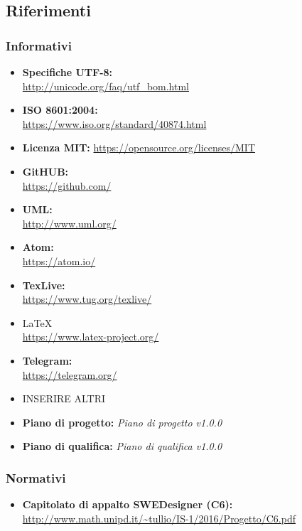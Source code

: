   \subsection{Riferimenti}
    \subsubsection{Informativi}
      \begin{itemize}
        \item \textbf{Specifiche UTF-8:}\\
        \url{http://unicode.org/faq/utf_bom.html}
        \item \textbf{ISO 8601:2004:} \\
        \url{https://www.iso.org/standard/40874.html}\\
        \item \textbf{Licenza MIT:}
        \url{https://opensource.org/licenses/MIT}\\
        \item \textbf{GitHUB:}\\
        \url{https://github.com/}
        \item \textbf{UML:} \\
        \url{http://www.uml.org/}
        \item \textbf{Atom:}\\
        \url{https://atom.io/}
        \item \textbf{TexLive:}\\
        \url{https://www.tug.org/texlive/}
        \item \LaTeX\\
        \url{https://www.latex-project.org/}
        \item \textbf{Telegram:}\\
        \url{https://telegram.org/}
        \item INSERIRE ALTRI
        \item \textbf{Piano di progetto:} \emph{Piano di progetto v1.0.0}
        \item \textbf{Piano di qualifica:} \emph{Piano di qualifica v1.0.0}
      \end{itemize}
    \subsubsection{Normativi}
      \begin{itemize}
        \item \textbf{Capitolato di appalto SWEDesigner (C6):}\\
        \url{http://www.math.unipd.it/~tullio/IS-1/2016/Progetto/C6.pdf}
      \end{itemize}
